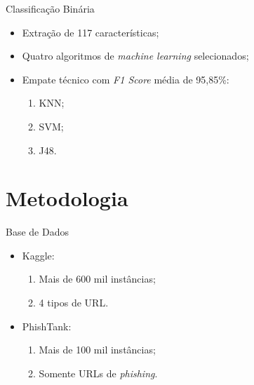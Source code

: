 \documentclass{beamer}
\begin{document}
\begin{frame}{Classificação Binária}

    \begin{itemize}
        \setlength{\itemsep}{10pt}
        \item Extração de 117 características;
        \item Quatro algoritmos de \emph{machine learning} selecionados;
        \item Empate técnico com \emph{F1 Score} média de 95,85\%:
        \begin{enumerate}
            \vspace{0.2cm}
            \setlength{\itemsep}{10pt}
            \item KNN;
            \item SVM;
            \item J48. 
        \end{enumerate}
    \end{itemize}
    
\end{frame}

\section{Metodologia}

\begin{frame}{Base de Dados}
    
    \begin{itemize}
        \setlength{\itemsep}{10pt}
        \item Kaggle\footnotemark:
        \begin{enumerate}
            \vspace{0.2cm}
            \setlength{\itemsep}{10pt}
            \item Mais de 600 mil instâncias;
            \item 4 tipos de URL.
        \end{enumerate}
        \item PhishTank\footnotemark:
        \begin{enumerate}
            \vspace{0.2cm}
            \setlength{\itemsep}{10pt}
            \item Mais de 100 mil instâncias;
            \item Somente URLs de \emph{phishing}.
        \end{enumerate}
    \end{itemize}

    
\end{frame}
\end{document}
